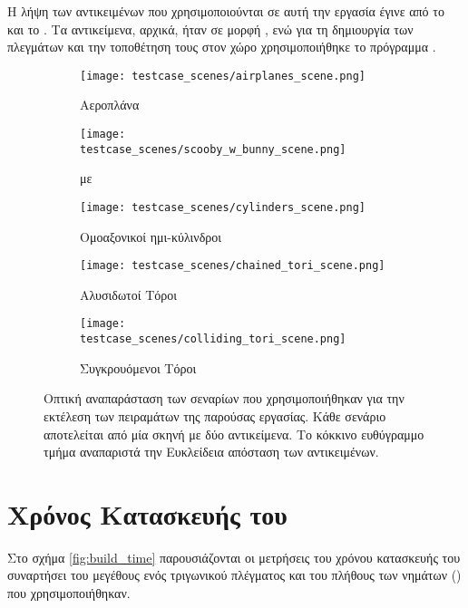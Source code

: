 Η λήψη των αντικειμένων που χρησιμοποιούνται σε αυτή την εργασία 
έγινε από το \cite{GrabCAD} και το 
\cite{3dcontentcentral}. 
Τα αντικείμενα, αρχικά, ήταν σε μορφή , ενώ για τη 
δημιουργία των πλεγμάτων και την τοποθέτηση τους στον χώρο χρησιμοποιήθηκε 
το πρόγραμμα .

\begin{figure}[H]
    \begin{subfigure}{0.49\textwidth}
        \texttt{[image: testcase\_scenes/airplanes\_scene.png]}
        \caption{Αεροπλάνα}
    \end{subfigure}
    \begin{subfigure}{0.49\textwidth}
        \texttt{[image: testcase\_scenes/scooby\_w\_bunny\_scene.png]}
        \caption{ με }
    \end{subfigure}
    \begin{subfigure}{0.49\textwidth}
        \texttt{[image: testcase\_scenes/cylinders\_scene.png]}
        \caption{Ομοαξονικοί ημι-κύλινδροι}
    \end{subfigure}
    \begin{subfigure}{0.49\textwidth}
        \texttt{[image: testcase\_scenes/chained\_tori\_scene.png]}
        \caption{Αλυσιδωτοί Τόροι}
    \end{subfigure}
    \centering
    \begin{subfigure}{0.49\textwidth}
        \texttt{[image: testcase\_scenes/colliding\_tori\_scene.png]}
        \caption{Συγκρουόμενοι Τόροι}
    \end{subfigure}
    \caption[Οπτική αναπαράσταση των σεναρίων των πειραμάτων]{
        Οπτική αναπαράσταση των σεναρίων που χρησιμοποιήθηκαν για την 
        εκτέλεση των πειραμάτων της παρούσας εργασίας.
        Κάθε σενάριο αποτελείται από μία σκηνή με δύο αντικείμενα.  
        Το κόκκινο ευθύγραμμο τμήμα αναπαριστά την Ευκλείδεια απόσταση 
        των αντικειμένων.
    }
    \label{fig:scenarios_photos}
\end{figure}



\section{Χρόνος Κατασκευής του }
Στο σχήμα \ref{fig:build_time} παρουσιάζονται οι μετρήσεις του 
χρόνου κατασκευής του  συναρτήσει του μεγέθους ενός 
τριγωνικού πλέγματος και του πλήθους των νημάτων ()
που χρησιμοποιήθηκαν.

